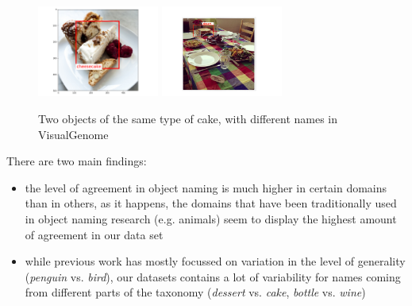 \documentclass[11pt,a4paper]{article}
\begin{document}
\begin{figure}[htbp]
\begin{center}
\includegraphics[height=3cm]{Figures/cheescake.png}
\includegraphics[height=3cm]{Figures/cheesecak2.pdf}
\caption{Two objects of the same type of cake, with different names in VisualGenome}
\label{fig:cake}
\end{center}
\end{figure}


There are two main findings:

\begin{itemize}
\item the level of agreement in object naming is much higher in certain domains than in others, as it happens, the domains that have been traditionally used in object naming research (e.g. animals) seem to display the highest amount of agreement in our data set 
\item while previous work has mostly focussed on variation in the level of generality (\emph{penguin} vs. \emph{bird}), our datasets contains a lot of variability for names coming from different parts of the taxonomy (\emph{dessert} vs. \emph{cake}, \emph{bottle} vs. \emph{wine})
\end{itemize}


\end{document}
